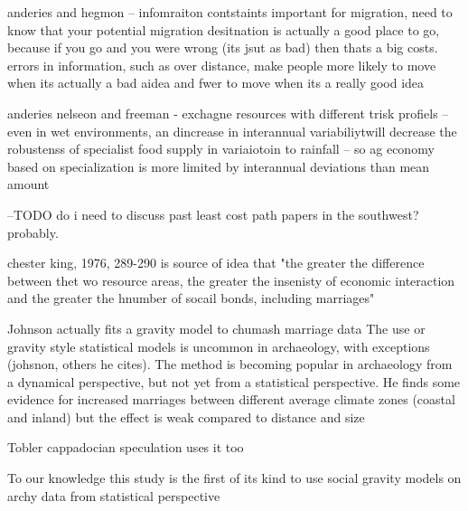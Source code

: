 \documentclass[fleqn,10pt]{wlscirep}
\begin{document}
anderies and hegmon -- infomraiton contstaints important for migration, need to know that your potential migration desitnation is actually a good place to go, because if you go and you were wrong (its jsut as bad) then thats a big costs. errors in information, such as over distance, make people more likely to move when its actually a bad aidea and fwer to move when its a really good idea

anderies nelseon and freeman - exchagne resources with different trisk profiels -- even in wet environments, an dincrease in interannual variabiliytwill decrease the robustenss of specialist food supply in variaiotoin to rainfall -- so ag economy based on specialization is more limited by interannual deviations than mean amount

--TODO do i need to discuss past least cost path papers in the southwest? probably.

chester king, 1976, 289-290 is source of idea that "the greater the difference between thet wo resource areas, the greater the insenisty of economic interaction and the greater the hnumber of socail bonds, including marriages"

Johnson actually fits a gravity model to chumash marriage data
The use or gravity style statistical models is uncommon in archaeology, with exceptions (johsnon, others he cites). The method is becoming popular in archaeology from a dynamical perspective, but not yet from a statistical perspective.
He finds some evidence for increased marriages between different average climate zones (coastal and inland) but the effect is weak compared to distance and  size

Tobler cappadocian speculation uses it too

To our knowledge this study is the first of its kind to use social gravity models on archy data from statistical perspective
\end{document}
